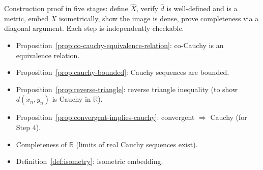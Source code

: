 \begin{remark*}
Construction proof in five stages: define $\hat{X}$, verify $\hat{d}$ is
well-defined and is a metric, embed $X$ isometrically, show the image is dense,
prove completeness via a diagonal argument.
Each step is independently checkable.
\end{remark*}

\begin{remark*}[Dependencies]
\begin{itemize}
  \item Proposition~\ref{prop:co-cauchy-equivalence-relation}: co-Cauchy is an equivalence relation.
  \item Proposition~\ref{prop:cauchy-bounded}: Cauchy sequences are bounded.
  \item Proposition~\ref{prop:reverse-triangle}: reverse triangle inequality
        (to show $d(x_n, y_n)$ is Cauchy in $\mathbb{R}$).
  \item Proposition~\ref{prop:convergent-implies-cauchy}: convergent $\Rightarrow$ Cauchy
        (for Step 4).
  \item Completeness of $\mathbb{R}$ (limits of real Cauchy sequences exist).
  \item Definition~\ref{def:isometry}: isometric embedding.
\end{itemize}
\end{remark*}
